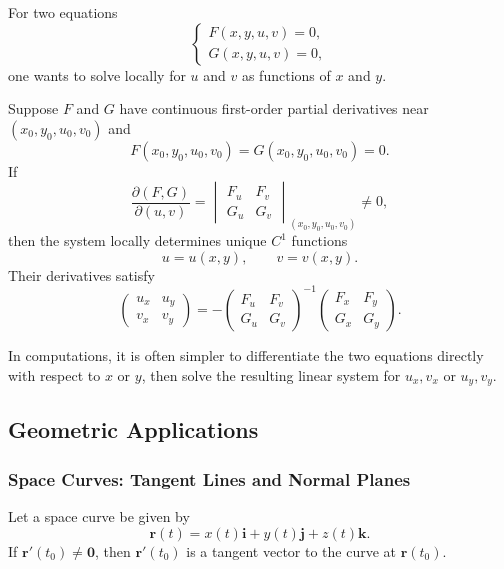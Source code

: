 For two equations
\[
\begin{cases}
    F(x,y,u,v)=0,\\
    G(x,y,u,v)=0,
\end{cases}
\]
one wants to solve locally for $u$ and $v$ as functions of $x$ and $y$.

\begin{theorem}
Suppose $F$ and $G$ have continuous first-order partial derivatives near $(x_0,y_0,u_0,v_0)$ and
\[
    F(x_0,y_0,u_0,v_0)=G(x_0,y_0,u_0,v_0)=0.
\]
If
\[
    \frac{\partial(F,G)}{\partial(u,v)}
    =\begin{vmatrix}F_u&F_v\\G_u&G_v\end{vmatrix}_{(x_0,y_0,u_0,v_0)}\ne0,
\]
then the system locally determines unique $C^1$ functions
\[
    u=u(x,y),\qquad v=v(x,y).
\]
Their derivatives satisfy
\[
    \begin{pmatrix}
    u_x&u_y\\
    v_x&v_y
    \end{pmatrix}
    =-
    \begin{pmatrix}
    F_u&F_v\\
    G_u&G_v
    \end{pmatrix}^{-1}
    \begin{pmatrix}
    F_x&F_y\\
    G_x&G_y
    \end{pmatrix}.
\]
\end{theorem}

\begin{note}
In computations, it is often simpler to differentiate the two equations directly with respect to $x$ or $y$, then solve the resulting linear system for $u_x,v_x$ or $u_y,v_y$.
\end{note}

\subsection{Geometric Applications}

\subsubsection{Space Curves: Tangent Lines and Normal Planes}

Let a space curve be given by
\[
    \mathbf{r}(t)=x(t)\mathbf{i}+y(t)\mathbf{j}+z(t)\mathbf{k}.
\]
If $\mathbf{r}'(t_0)\ne\mathbf{0}$, then $\mathbf{r}'(t_0)$ is a tangent vector to the curve at $\mathbf{r}(t_0)$.

